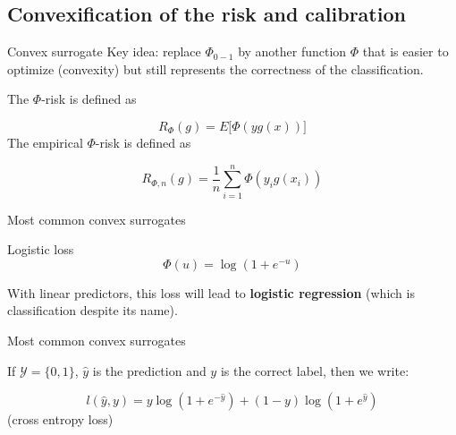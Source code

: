 \documentclass[usenames,dvipsnames]{beamer}
\begin{document}
\subsection{Convexification of the risk and calibration}%
\label{sub:convexification_of_the_risk}

\begin{frame}{Convex surrogate}
    Key idea: replace $ \Phi_{0-1}$ by another function $\Phi$ that is easier to optimize (convexity) but still represents the correctness of the classification.

    \begin{definition}
        The $\Phi$-risk is defined as

	\begin{equation}
	    R_{\Phi}(g) = E\Big[ \Phi(yg(x))\Big]
	\end{equation}
        The empirical $\Phi$-risk is defined as

	\begin{equation}
	    R_{\Phi, n}(g) = \frac{1}{n} \sum^{n}_{i=1}\Phi(y_ig(x_i))
	\end{equation}
    \end{definition}
\end{frame}

\begin{frame}{Most common convex surrogates}

    \begin{definition}{Logistic loss}
    \label{loss:logistic}
	\begin{equation}
	    \Phi(u) = \log(1+e^{-u})
	\end{equation}
    \end{definition}

    With linear predictors, this loss will lead to \textbf{{logistic regression}} (which is classification despite its name).
    
\end{frame}

\begin{frame}{Most common convex surrogates}

    If $ \mathcal{Y}= \{0, 1\}$, $ \hat{y}$ is the prediction and $y$ is the correct label, then we write:

	\begin{equation}
	    l(\hat{y}, y) = y\log(1+e^{- \hat{y}})+ (1-y)\log(1+e^{ \hat{y}})
	\end{equation}
    (cross entropy loss)
    
\end{frame}
\end{document}
